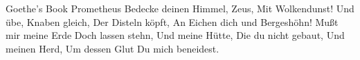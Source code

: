 {Goethe's Book}
{Prometheus}
{Bedecke deinen Himmel, Zeus,
	Mit Wolkendunst!
	Und \"ube, Knaben gleich,
	Der Disteln k\"opft,
	An Eichen dich und Bergesh\"ohn!
	Mußt mir meine Erde
	Doch lassen stehn,
	Und meine H\"utte,
	Die du nicht gebaut,
	Und meinen Herd,
	Um dessen Glut
	Du mich beneidest.
}